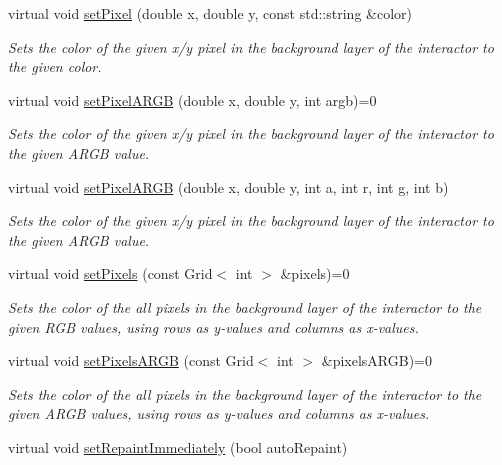 \begin{DoxyCompactItemize}
virtual void \mbox{\hyperlink{classGDrawingSurface_a09f9640e4ff7388dcfc391efd88d2415}{set\+Pixel}} (double x, double y, const std\+::string \&color)
\begin{DoxyCompactList}\small\item\em Sets the color of the given x/y pixel in the background layer of the interactor to the given color. \end{DoxyCompactList}\item 
virtual void \mbox{\hyperlink{classGDrawingSurface_ab2f7c5a9462f552ad3f30d23c04605dd}{set\+Pixel\+A\+R\+GB}} (double x, double y, int argb)=0
\begin{DoxyCompactList}\small\item\em Sets the color of the given x/y pixel in the background layer of the interactor to the given A\+R\+GB value. \end{DoxyCompactList}\item 
virtual void \mbox{\hyperlink{classGDrawingSurface_a62a8b1555ae3a073a84b0a1c071c65b1}{set\+Pixel\+A\+R\+GB}} (double x, double y, int a, int r, int g, int b)
\begin{DoxyCompactList}\small\item\em Sets the color of the given x/y pixel in the background layer of the interactor to the given A\+R\+GB value. \end{DoxyCompactList}\item 
virtual void \mbox{\hyperlink{classGDrawingSurface_aa80f4b7381bd418116baee600eed37fe}{set\+Pixels}} (const Grid$<$ int $>$ \&pixels)=0
\begin{DoxyCompactList}\small\item\em Sets the color of the all pixels in the background layer of the interactor to the given R\+GB values, using rows as y-\/values and columns as x-\/values. \end{DoxyCompactList}\item 
virtual void \mbox{\hyperlink{classGDrawingSurface_a7d813f0f29751a217201f24cef402306}{set\+Pixels\+A\+R\+GB}} (const Grid$<$ int $>$ \&pixels\+A\+R\+GB)=0
\begin{DoxyCompactList}\small\item\em Sets the color of the all pixels in the background layer of the interactor to the given A\+R\+GB values, using rows as y-\/values and columns as x-\/values. \end{DoxyCompactList}\item 
virtual void \mbox{\hyperlink{classGDrawingSurface_abf5590a3992dcb7896ed449e65961da3}{set\+Repaint\+Immediately}} (bool auto\+Repaint)

\end{DoxyCompactItemize}
